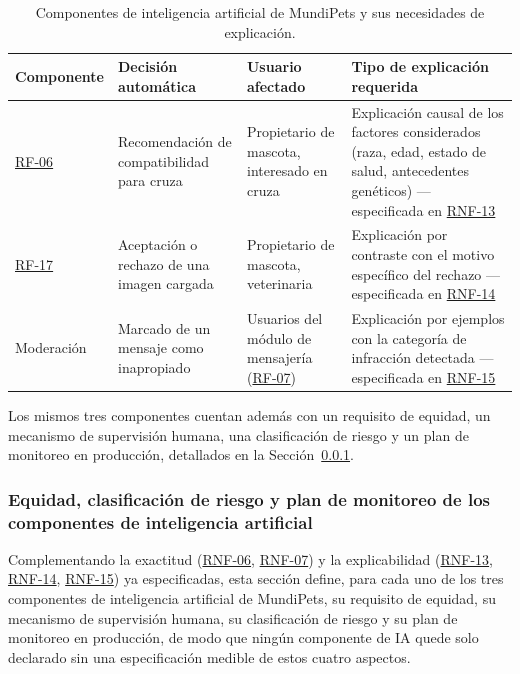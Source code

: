 \documentclass[journal,onecolumn]{IEEEtran}
\begin{document}
	\begin{table}[H]
		\centering
		\caption{Componentes de inteligencia artificial de MundiPets y sus necesidades de explicación.}
		\label{tab:componentes-ia}
		\small
		\begin{tabularx}{\textwidth}{@{}p{2.0cm} p{3.0cm} p{2.6cm} X@{}}
			\toprule
			\textbf{Componente} & \textbf{Decisión automática} & \textbf{Usuario afectado} & \textbf{Tipo de explicación requerida} \\
			\midrule
			\hyperref[tab:RF-06]{RF-06} & Recomendación de compatibilidad para cruza & Propietario de mascota, interesado en cruza & Explicación causal de los factores considerados (raza, edad, estado de salud, antecedentes genéticos) --- especificada en \hyperref[tab:RNF-13]{RNF-13} \\
			\addlinespace
			\hyperref[tab:RF-17]{RF-17} & Aceptación o rechazo de una imagen cargada & Propietario de mascota, veterinaria & Explicación por contraste con el motivo específico del rechazo --- especificada en \hyperref[tab:RNF-14]{RNF-14} \\
			\addlinespace
			Moderación & Marcado de un mensaje como inapropiado & Usuarios del módulo de mensajería (\hyperref[tab:RF-07]{RF-07}) & Explicación por ejemplos con la categoría de infracción detectada --- especificada en \hyperref[tab:RNF-15]{RNF-15} \\
			\bottomrule
		\end{tabularx}
	\end{table}
	Los mismos tres componentes cuentan además con un requisito de equidad,
	un mecanismo de supervisión humana, una clasificación de riesgo y un
	plan de monitoreo en producción, detallados en la
	Sección~\ref{sec:equidad-riesgo-ia}.
	
\subsubsection{Equidad, clasificación de riesgo y plan de monitoreo de los componentes de inteligencia artificial}
\label{sec:equidad-riesgo-ia}

Complementando la exactitud (\hyperref[tab:RNF-06]{RNF-06}, \hyperref[tab:RNF-07]{RNF-07}) y la explicabilidad (\hyperref[tab:RNF-13]{RNF-13},
\hyperref[tab:RNF-14]{RNF-14}, \hyperref[tab:RNF-15]{RNF-15}) ya especificadas, esta sección define, para cada uno de los
tres componentes de inteligencia artificial de MundiPets, su requisito de
equidad, su mecanismo de supervisión humana, su clasificación de riesgo y
su plan de monitoreo en producción, de modo que ningún componente de IA
quede solo declarado sin una especificación medible de estos cuatro
aspectos.
\end{document}
